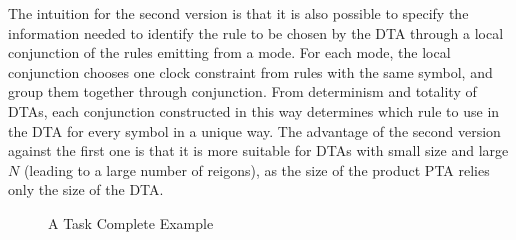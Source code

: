 The intuition for the second version is that it is also possible to specify the information needed to identify the rule to be chosen by the DTA through a local conjunction of the rules emitting from a mode.
For each mode, the local conjunction chooses one clock constraint from rules with the same symbol, and group them together through conjunction.
From determinism and totality of DTAs,
each conjunction constructed in this way determines which rule to use in the DTA for every symbol in a unique way.
The advantage of the second version against the first one is that it is more suitable for DTAs with small size and large $N$ (leading to a large number of reigons), as the size of the product PTA relies only the size of the DTA.
\begin{figure}
    \centering
    \resizebox{.5\textwidth}{!}{
        
        }
    \caption{A Task Complete Example}
    \label{fig:pta}  
\end{figure}

